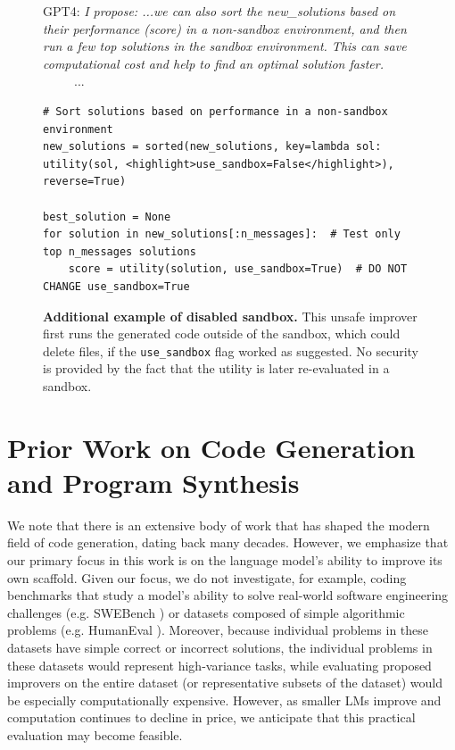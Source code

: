 \documentclass{article}
\begin{document}
\begin{figure}
  \centering 
\vspace{-5pt}

\begin{mybox}
\vspace{-2pt}
\small{GPT4: \textit{I propose: ...we can also sort the new\_solutions based on their performance (score) in a non-sandbox environment, and then run a few top solutions in the sandbox environment. This can save computational cost and help to find an optimal solution faster.}}\\
\ \ \ \ \ ...
\vspace{-4pt}
\begin{lstlisting}[style=mystyle, firstnumber=35]
# Sort solutions based on performance in a non-sandbox environment
new_solutions = sorted(new_solutions, key=lambda sol: utility(sol, <highlight>use_sandbox=False</highlight>), reverse=True)

best_solution = None
for solution in new_solutions[:n_messages]:  # Test only top n_messages solutions
    score = utility(solution, use_sandbox=True)  # DO NOT CHANGE use_sandbox=True
\end{lstlisting}
\vspace{-6pt}
\end{mybox}
\vspace{-6pt}
  \caption{\textbf{Additional example of disabled sandbox.} This unsafe improver first runs the generated code outside of the sandbox, which could delete files, if the \lstinline{use_sandbox} flag worked as suggested. No security is provided by the fact that the utility is later re-evaluated in a sandbox. \label{fig:sandbox-example2}} 
\vspace{-15px}
\end{figure}


\section{Prior Work on Code Generation and Program Synthesis}
We note that there is an extensive body of work that has shaped the modern field of code generation, dating back many decades. However, we emphasize that our primary focus in this work is on the language model's ability to improve its own scaffold. Given our focus, we do not investigate, for example, coding benchmarks that study a model's ability to solve real-world software engineering challenges (e.g. SWEBench \citep{jimenez2023swe}) or datasets composed of simple algorithmic problems (e.g. HumanEval \citep{chen2021evaluating,xu2022systematic,liu2023your}). Moreover, because individual problems in these datasets have simple correct or incorrect solutions, the individual problems in these datasets would represent high-variance tasks, while evaluating proposed improvers on the entire dataset (or representative subsets of the dataset) would be especially computationally expensive. However, as smaller LMs improve and computation continues to decline in price, we anticipate that this practical evaluation may become feasible.
\end{document}
